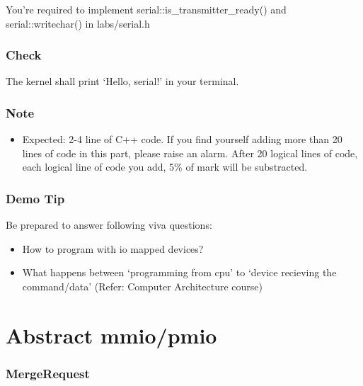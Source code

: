 \documentclass[]{book}
\begin{document}
You're required to implement serial::is\_transmitter\_ready() and
serial::writechar() in labs/serial.h

\subsubsection*{Check}\label{check-1}

The kernel shall print `Hello, serial!' in your terminal.

\subsubsection*{Note}\label{note-2}

\begin{itemize}
\itemsep1pt\parskip0pt
\item
  Expected: 2-4 line of C++ code. If you find yourself adding more than
  20 lines of code in this part, please raise an alarm. After 20 logical
  lines of code, each logical line of code you add, 5\% of mark will be
  substracted.
\end{itemize}

\subsubsection*{Demo Tip}\label{demo-tip-1}

Be prepared to answer following viva questions:

\begin{itemize}
\itemsep1pt\parskip0pt
\item
  How to program with io mapped devices?
\item
  What happens between `programming from cpu' to `device recieving the
  command/data' (Refer: Computer Architecture course)
\end{itemize}

\section{Abstract mmio/pmio}\label{abstract-mmiopmio}

\subsubsection*{MergeRequest}\label{mergerequest-2}
\end{document}
